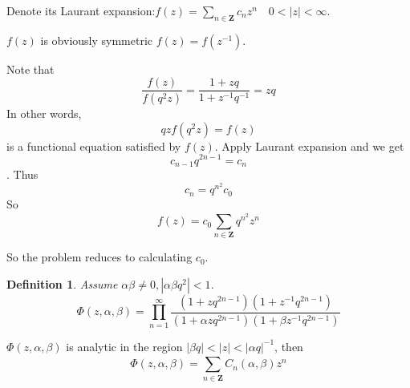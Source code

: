 \documentclass{article}
\newtheorem{Def}{Definition}[section]
\begin{document}
Denote its Laurant expansion:$f(z) = \sum\limits_{n\in \bm{Z}}^{} c_nz^n \quad 0<|z|<\infty$.

$f(z)$ is obviously symmetric $f(z)=f(z^{-1})$.

Note that
\begin{equation}
\frac{f(z)}{f(q^2z)} = \frac{1+zq}{1+z^{-1}q^{-1}} = zq
\end{equation}
In other words, \[qz f(q^2z) =f(z)\] is a functional equation satisfied by $f(z)$. Apply Laurant expansion and we get \[c_{n-1}q^{2n-1} = c_n\]. Thus
\begin{equation}
c_n=q^{n^2}c_0
\end{equation}
So
\begin{equation}
f(z)=c_0 \sum\limits_{n\in \bm{Z}}^{}q^{n^2}z^n
\end{equation}

So the problem reduces to calculating $c_0$.

\begin{Def}
 Assume $\alpha\beta\neq 0, |\alpha\beta q^2|<1$.
\begin{equation}
 \Phi(z,\alpha,\beta) =\prod_{n=1}^{\infty} \frac{(1+zq^{2n-1})(1+z^{-1}q^{2n-1})}{(1+\alpha zq^{2n-1})(1+\beta z^{-1}q^{2n-1})}
\end{equation}
\end{Def}

$\Phi(z,\alpha,\beta)$ is analytic in the region $|\beta q|<|z|<|\alpha q|^{-1}$, then
\begin{equation}
\Phi(z,\alpha,\beta) = \sum\limits_{n\in \bm{Z}}^{}  C_n(\alpha,\beta)z^n
\end{equation}
\end{document}
